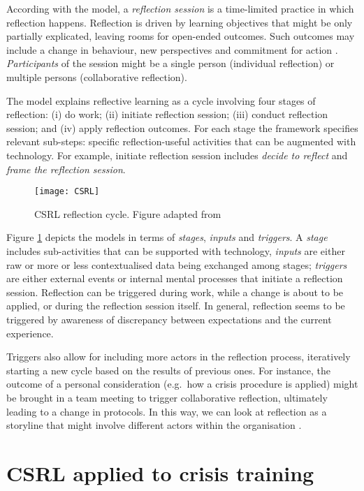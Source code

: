 According with the model, a \emph{reflection session} is a time-limited practice in which reflection happens. Reflection is driven by learning objectives that might be only partially explicated, leaving rooms for open-ended outcomes. Such outcomes may include a change in behaviour, new perspectives and commitment for action \autocite{boud1985reflection}. \emph{Participants} of the session might be a single person (individual reflection) or multiple persons (collaborative reflection).

The model explains reflective learning as a cycle involving four stages of reflection: (i) do work; (ii) initiate reflection session; (iii) conduct reflection session; and (iv) apply reflection outcomes. For each stage the framework specifies relevant sub-steps: specific reflection-useful activities that can be augmented with technology. For example, initiate reflection session includes \emph{decide to reflect} and \emph{frame the reflection session}.
\begin{figure}
	[tbh] \centering 
	\texttt{[image: CSRL]} \caption{CSRL reflection cycle. Figure adapted from \protect\autocite{Krogstie:2013kf}} \label{fig:csrl-model} 
\end{figure}

Figure \ref{fig:csrl-model} depicts the models in terms of \emph{stages}, \emph{inputs} and \emph{triggers}. A \emph{stage} includes sub-activities that can be supported with technology, \emph{inputs} are either raw or more or less contextualised data being exchanged among stages; \emph{triggers} are either external events or internal mental processes that initiate a reflection session. Reflection can be triggered during work, while a change is about to be applied, or during the reflection session itself. In general, reflection seems to be triggered by awareness of discrepancy between expectations and the current experience.

Triggers also allow for including more actors in the reflection process, iteratively starting a new cycle based on the results of previous ones. For instance, the outcome of a personal consideration (e.g.~how a crisis procedure is applied) might be brought in a team meeting to trigger collaborative reflection, ultimately leading to a change in protocols. In this way, we can look at reflection as a storyline that might involve different actors within the organisation \autocite{PrPK13}.

\section{CSRL applied to crisis training}\label{csrl-crisis}

